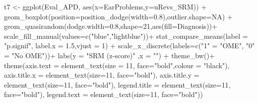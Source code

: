 \documentclass[a4paper, twoside]{templates/ociamthesis}
\newenvironment{Shaded}{\begin{snugshade}}{\end{snugshade}}
\newcommand{\AttributeTok}[1]{\textcolor[rgb]{0.77,0.63,0.00}{#1}}
\newcommand{\ConstantTok}[1]{\textcolor[rgb]{0.00,0.00,0.00}{#1}}
\newcommand{\DecValTok}[1]{\textcolor[rgb]{0.00,0.00,0.81}{#1}}
\newcommand{\FloatTok}[1]{\textcolor[rgb]{0.00,0.00,0.81}{#1}}
\newcommand{\FunctionTok}[1]{\textcolor[rgb]{0.00,0.00,0.00}{#1}}
\newcommand{\NormalTok}[1]{#1}
\newcommand{\OtherTok}[1]{\textcolor[rgb]{0.56,0.35,0.01}{#1}}
\newcommand{\SpecialCharTok}[1]{\textcolor[rgb]{0.00,0.00,0.00}{#1}}
\newcommand{\StringTok}[1]{\textcolor[rgb]{0.31,0.60,0.02}{#1}}
\renewenvironment{Shaded}
{
  \vspace{4pt}%
  \begin{snugshade}%
}{%
  \end{snugshade}%
  \vspace{4pt}%
}
\begin{document}
\begin{Shaded}
\begin{Highlighting}[]
\NormalTok{t7 }\OtherTok{\textless{}{-}} \FunctionTok{ggplot}\NormalTok{(Eval\_APD, }\FunctionTok{aes}\NormalTok{(}\AttributeTok{x=}\NormalTok{EarProblems,}\AttributeTok{y=}\NormalTok{uRevs\_SRM)) }\SpecialCharTok{+}
    \FunctionTok{geom\_boxplot}\NormalTok{(}\AttributeTok{position=}\FunctionTok{position\_dodge}\NormalTok{(}\AttributeTok{width=}\FloatTok{0.8}\NormalTok{),}\AttributeTok{outlier.shape=}\ConstantTok{NA}\NormalTok{) }\SpecialCharTok{+} 
  \FunctionTok{geom\_quasirandom}\NormalTok{(}\AttributeTok{dodge.width=}\FloatTok{0.8}\NormalTok{,}\AttributeTok{shape=}\DecValTok{21}\NormalTok{,}\FunctionTok{aes}\NormalTok{(}\AttributeTok{fill=}\NormalTok{Diagnosis))}\SpecialCharTok{+}
  \FunctionTok{scale\_fill\_manual}\NormalTok{(}\AttributeTok{values=}\FunctionTok{c}\NormalTok{(}\StringTok{"blue"}\NormalTok{,}\StringTok{"lightblue"}\NormalTok{))}\SpecialCharTok{+}
  \FunctionTok{stat\_compare\_means}\NormalTok{(}\AttributeTok{label =}  \StringTok{"p.signif"}\NormalTok{, }\AttributeTok{label.x =} \FloatTok{1.5}\NormalTok{,}\AttributeTok{vjust =} \DecValTok{1}\NormalTok{) }\SpecialCharTok{+}  
  \FunctionTok{scale\_x\_discrete}\NormalTok{(}\AttributeTok{labels=}\FunctionTok{c}\NormalTok{(}\StringTok{"1"} \OtherTok{=} \StringTok{"OME"}\NormalTok{, }\StringTok{"0"} \OtherTok{=} \StringTok{"No OME"}\NormalTok{))}\SpecialCharTok{+}
  \FunctionTok{labs}\NormalTok{(}\AttributeTok{y =} \StringTok{"SRM (z{-}score)"}\NormalTok{ ,}\AttributeTok{x =} \StringTok{""}\NormalTok{) }\SpecialCharTok{+}
  \FunctionTok{theme\_bw}\NormalTok{()}\SpecialCharTok{+}
  \FunctionTok{theme}\NormalTok{(}\AttributeTok{axis.text =} \FunctionTok{element\_text}\NormalTok{(}\AttributeTok{size =} \DecValTok{11}\NormalTok{, }\AttributeTok{face=}\StringTok{"bold"}\NormalTok{,}\AttributeTok{colour =} \StringTok{"black"}\NormalTok{),}
        \AttributeTok{axis.title.x =} \FunctionTok{element\_text}\NormalTok{(}\AttributeTok{size=}\DecValTok{11}\NormalTok{, }\AttributeTok{face=}\StringTok{"bold"}\NormalTok{),}
        \AttributeTok{axis.title.y =} \FunctionTok{element\_text}\NormalTok{(}\AttributeTok{size=}\DecValTok{11}\NormalTok{, }\AttributeTok{face=}\StringTok{"bold"}\NormalTok{),}
        \AttributeTok{legend.title =} \FunctionTok{element\_text}\NormalTok{(}\AttributeTok{size=}\DecValTok{11}\NormalTok{, }\AttributeTok{face=}\StringTok{"bold"}\NormalTok{),}
        \AttributeTok{legend.text  =} \FunctionTok{element\_text}\NormalTok{(}\AttributeTok{size=}\DecValTok{11}\NormalTok{, }\AttributeTok{face=}\StringTok{"bold"}\NormalTok{))}


\end{Highlighting}
\end{Shaded}
\end{document}

